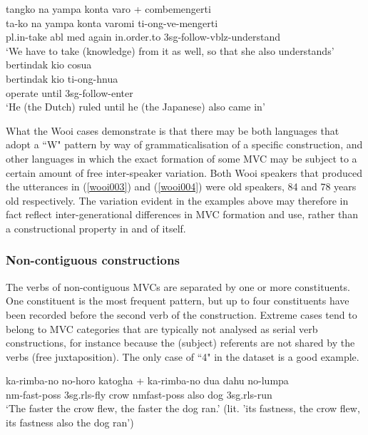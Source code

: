 \ea \label{wooi003}
\gll tangko na yampa konta varo + combemengerti \\
ta-ko na yampa konta varomi ti-ong-ve-mengerti \\
\acs{pl}.\acs{in}-take \acs{abl} \acs{med} again in.order.to 3\acs{sg}-follow-\acs{vblz}-understand \\
\glft `We have to take (knowledge) from it as well, so that she also understands' \\ 
\z
\xe
\ea \label{wooi004}
\gll bertindak kio cosua \\
bertindak kio ti-ong-hnua \\
\glc operate until 3\acs{sg}-follow-enter \\
\glft `He (the Dutch) ruled until he (the Japanese) also came in' \\ 
\z
\xe

What the Wooi cases demonstrate is that there may be both languages that adopt a ``W" pattern by way of grammaticalisation of a specific construction, and other languages in which the exact formation of some MVC may be subject to a certain amount of free inter-speaker variation. Both Wooi speakers that produced the utterances in (\ref{wooi003}) and (\ref{wooi004}) were old speakers, 84 and 78 years old respectively. The variation evident in the examples above may therefore in fact reflect inter-generational differences in MVC formation and use, rather than a constructional property in and of itself.

\subsubsection{Non-contiguous constructions}

The verbs of non-contiguous MVCs are separated by one or more constituents. One constituent is the most frequent pattern, but up to four constituents have been recorded before the second verb of the construction. Extreme cases tend to belong to MVC categories that are typically not analysed as serial verb constructions, for instance because the (subject) referents are not shared by the verbs (free juxtaposition). The only case of ``4" in the dataset is a good example.

\ea \label{Muna047}
\gll ka-rimba-no no-horo katogha + ka-rimba-no dua dahu no-lumpa \\
\acs{nm}-fast-\acs{poss} 3\acs{sg}.\acs{rls}-fly crow \acs{nm}fast-\acs{poss} also dog 3\acs{sg}.\acs{rls}-run \\
\glft `The faster the crow flew, the faster the dog ran.' (lit. 'its fastness, the crow flew, its fastness also the dog ran') \\ 
\z
\xe

